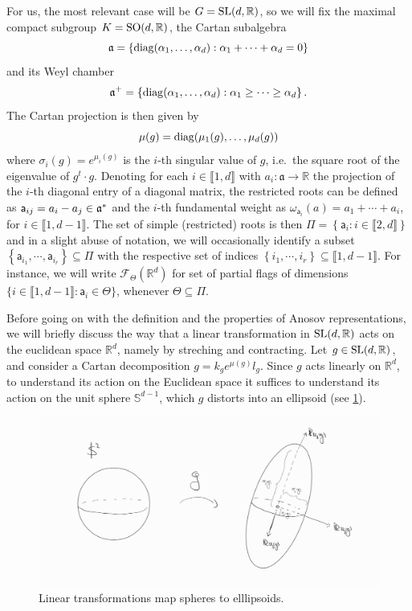 \documentclass{report}
\begin{document}
For us, the most relevant case will be $G = \operatorname{{\mathrm{SL}}}(d, \mathbb R)$, so we will fix the maximal compact subgroup $K = \operatorname{{\mathrm{SO}}}(d, \mathbb R)$, the Cartan subalgebra
\[
    \mathfrak a = \left\{
        \operatorname{diag}(\alpha_1, \ldots, \alpha_d) : \alpha_1 + \cdots + \alpha_d = 0
    \right\}
\]
and its Weyl chamber
\[
    \mathfrak a^+ = \left\{
        \operatorname{diag}(\alpha_1, \ldots, \alpha_d) : \alpha_1 \geq \cdots \geq \alpha_d
    \right\}.
\]
The Cartan projection is then given by
\[
\mu(g) = \operatorname{diag}(\mu_1(g), \ldots, \mu_d(g))
\]
where $\sigma_i(g) = e^{\mu_i(g)}$ is the $i$-th singular value of $g$, i.e.\ the square root of the eigenvalue of $g^t \cdot g$.
Denoting for each $i \in \llbracket 1, d \rrbracket$ with $a_i:\mathfrak a \to \mathbb R$ the projection of the $i$-th diagonal entry of a diagonal matrix, the restricted roots can be defined as ${\sf a}_{ij} = a_i - a_j \in \mathfrak a^*$ and the $i$-th fundamental weight as $\omega_{\mathsf{a}_i}(a) = a_1 + \cdots + a_i$, for $i \in \llbracket 1, d - 1\rrbracket$.
The set of simple (restricted) roots is then $\Pi = \left\{ \mathsf{a}_i : i \in \llbracket 2, d \rrbracket \right\}$ and in a slight abuse of notation, we will occasionally identify a subset $\left\{ \mathsf a_{i_1}, \cdots, \mathsf a_{i_r} \right\} \subseteq \Pi$ with the respective set of indices  $\left\{ i_1, \cdots, i_r \right\} \subseteq \llbracket 1, d-1 \rrbracket$.
For instance, we will write $\mathcal F_\Theta(\mathbb R^d)$ for set of partial flags of dimensions $\{ i \in \llbracket 1, d-1 \rrbracket: \mathsf a_i \in \Theta\}$, whenever $\Theta \subseteq \Pi$.

Before going on with the definition and the properties of Anosov representations, we will briefly discuss the way that a linear transformation in $\operatorname{{\mathrm{SL}}}(d, \mathbb R)$ acts on the euclidean space $\mathbb R^d$, namely by streching and contracting.
Let $g \in \operatorname{{\mathrm{SL}}}(d, \mathbb R)$, and consider a Cartan decomposition $g = k_g e^{\mu(g)} l_g$.
Since $g$ acts linearly on $\mathbb R^d$, to understand its action on the Euclidean space it suffices to understand its action on the unit sphere $\mathbb S^{d-1}$, which $g$ distorts into an ellipsoid (see \cref{fig:ball_stretching}).
\begin{figure}[h]
    \centering
    \includegraphics[width=\textwidth]{ball_streching.jpg}
    \caption{Linear transformations map spheres to elllipsoids.}
    \label{fig:ball_stretching}
\end{figure}
\end{document}
